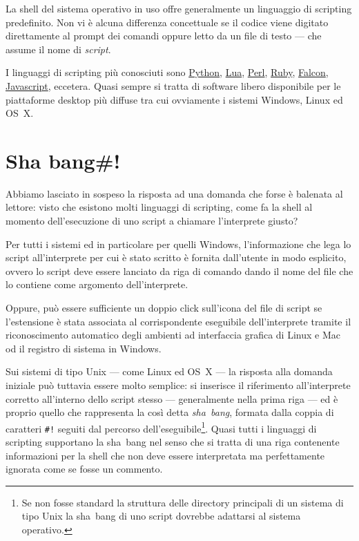 La shell del sistema operativo in uso offre generalmente un linguaggio di
scripting predefinito. Non vi è alcuna differenza concettuale se il codice
viene digitato direttamente al prompt dei comandi oppure letto da un file di
testo --- che assume il nome di \emph{script}.

I linguaggi di scripting più conosciuti sono
\href{http://www.python.org/}{Python}, \href{http://www.lua.org/}{Lua},
\href{http://www.perl.org/}{Perl}, \href{http://www.ruby-lang.org/}{Ruby},
\href{http://www.falconpl.org/}{Falcon},
\href{http://it.wikipedia.org/wiki/JavaScript}{Javascript}, eccetera. Quasi
sempre si tratta di software libero disponibile per le piattaforme desktop più
diffuse tra cui ovviamente i sistemi Windows, Linux ed OS~X.

\section{Sha bang\#!}

Abbiamo lasciato in sospeso la risposta ad una domanda che forse è balenata al
lettore: visto che esistono molti linguaggi di scripting, come fa la shell al
momento dell'esecuzione di uno script a chiamare l'interprete giusto?

Per tutti i sistemi ed in particolare per quelli Windows, l'informazione che
lega lo script all'interprete per cui è stato scritto è fornita dall'utente in
modo esplicito, ovvero lo script deve essere lanciato da riga di comando dando
il nome del file che lo contiene come argomento dell'interprete.

Oppure, può essere sufficiente un doppio click sull'icona del file di script
se l'estensione è stata associata al corrispondente eseguibile dell'interprete
tramite il riconoscimento automatico degli ambienti ad interfaccia grafica di
Linux e Mac od il registro di sistema in Windows.

Sui sistemi di tipo Unix --- come Linux ed OS~X --- la risposta alla domanda
iniziale può tuttavia essere molto semplice: si inserisce il riferimento
all'interprete corretto all'interno dello script stesso --- generalmente nella
prima riga --- ed è proprio quello che rappresenta la così detta
\emph{sha~bang}, formata dalla coppia di caratteri \texttt{\#!} seguiti dal
percorso dell'eseguibile\footnote{Se non fosse standard la struttura delle
  directory principali di un sistema di tipo Unix la sha~bang di uno script
  dovrebbe adattarsi al sistema operativo.}. Quasi tutti i linguaggi di
scripting supportano la sha~bang nel senso che si tratta di una riga contenente
informazioni per la shell che non deve essere interpretata ma perfettamente
ignorata come se fosse un commento.

